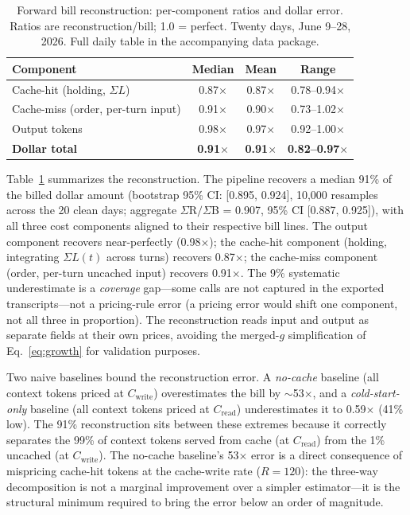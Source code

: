 \documentclass[11pt]{article}
\theoremstyle{definition}
\theoremstyle{remark}
\begin{document}
\begin{table}[ht]
\centering
\caption{Forward bill reconstruction: per-component ratios and dollar error. Ratios are reconstruction/bill; 1.0 = perfect. Twenty days, June 9--28, 2026. Full daily table in the accompanying data package.}
\label{tab:recon}
\begin{tabular}{l c c c}
\toprule
Component & Median & Mean & Range \\
\midrule
Cache-hit (holding, $\Sigma L$) & 0.87$\times$ & 0.87$\times$ & 0.78--0.94$\times$ \\
Cache-miss (order, per-turn input) & 0.91$\times$ & 0.90$\times$ & 0.73--1.02$\times$ \\
Output tokens & 0.98$\times$ & 0.97$\times$ & 0.92--1.00$\times$ \\
\midrule
\textbf{Dollar total} & \textbf{0.91$\times$} & \textbf{0.91$\times$} & \textbf{0.82--0.97$\times$} \\
\bottomrule
\end{tabular}
\end{table}

Table~\ref{tab:recon} summarizes the reconstruction. The pipeline recovers a median 91\% of the billed dollar amount (bootstrap 95\% CI: [0.895, 0.924], 10,000 resamples across the 20 clean days; aggregate $\Sigma$R$/\Sigma$B = 0.907, 95\% CI [0.887, 0.925]), with all three cost components aligned to their respective bill lines. The output component recovers near-perfectly (0.98$\times$); the cache-hit component (holding, integrating $\Sigma L(t)$ across turns) recovers 0.87$\times$; the cache-miss component (order, per-turn uncached input) recovers 0.91$\times$. The 9\% systematic underestimate is a \emph{coverage} gap---some calls are not captured in the exported transcripts---not a pricing-rule error (a pricing error would shift one component, not all three in proportion). The reconstruction reads input and output as separate fields at their own prices, avoiding the merged-$g$ simplification of Eq.~\ref{eq:growth} for validation purposes.

Two naive baselines bound the reconstruction error. A \emph{no-cache} baseline (all context tokens priced at $C_{\text{write}}$) overestimates the bill by $\sim$53$\times$, and a \emph{cold-start-only} baseline (all context tokens priced at $C_{\text{read}}$) underestimates it to 0.59$\times$ (41\% low). The 91\% reconstruction sits between these extremes because it correctly separates the 99\% of context tokens served from cache (at $C_{\text{read}}$) from the 1\% uncached (at $C_{\text{write}}$). The no-cache baseline's 53$\times$ error is a direct consequence of mispricing cache-hit tokens at the cache-write rate ($R=120$): the three-way decomposition is not a marginal improvement over a simpler estimator---it is the structural minimum required to bring the error below an order of magnitude.
\end{document}
